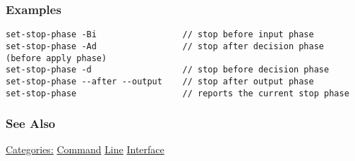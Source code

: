 \subsubsection*{Examples}
\begin{verbatim}
set-stop-phase -Bi                 // stop before input phase
set-stop-phase -Ad                 // stop after decision phase (before apply phase)
set-stop-phase -d                  // stop before decision phase
set-stop-phase --after --output    // stop after output phase
set-stop-phase                     // reports the current stop phase
\end{verbatim}
\subsubsection*{See Also}
\hyperref[Categories:]{Categories:} \hyperref[Command]{Command} \hyperref[Line]{Line} \hyperref[Interface]{Interface} 